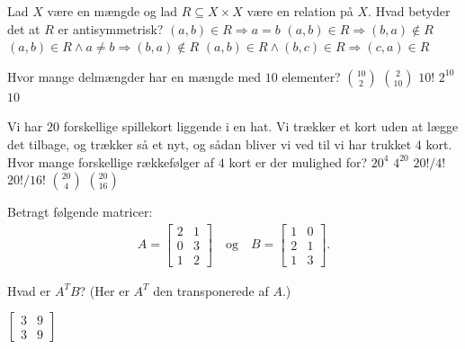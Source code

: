 Lad $X$ være en mængde og lad $R \subseteq X \times X$ være en relation på $X$.
Hvad betyder det at $R$ er antisymmetrisk?
\etsvar
\mulighederstart
\svar $(a,b)\in R \Rightarrow a=b$
\svar $(a,b)\in R \Rightarrow (b,a)\notin R$
\svar $(a,b) \in R \land a\neq b \Rightarrow (b,a) \notin R$ \korrekt
\svar $(a,b) \in R \land (b,c) \in R \Rightarrow (c,a) \in R$
\mulighederslut
{}
\sideskift

Hvor mange delmængder har en mængde med $10$ elementer?
\etsvar
\mulighederstart
\svar $\binom{10}{2}$
\svar $\binom{2}{10}$
\svar $10!$
\svar $2^{10}$ \korrekt
\svar $10$
\mulighederslut
{}


Vi har $20$ forskellige spillekort liggende i en hat.
Vi trækker et kort uden at lægge det tilbage, og trækker så et nyt, og sådan bliver vi ved til vi har trukket $4$ kort.
Hvor mange forskellige rækkefølger af $4$ kort er der mulighed for?
\etsvar
\mulighederstart
\svar $20^4$
\svar $4^{20}$
\svar $20!/4!$
\svar $20!/16!$  \korrekt
\svar $\binom{20}{4}$
\svar $\binom{20}{16}$
\mulighederslut
{}

Betragt følgende matricer:
\begin{align*}
    A =
\begin{bmatrix}
2 & 1\\
0 & 3\\
1 & 2
\end{bmatrix}
\quad \text{og} \quad
B =
\begin{bmatrix}
1 & 0\\
2 & 1\\
1 & 3
\end{bmatrix}.
\end{align*}

Hvad er \(A^{T}B\)? (Her er \(A^{T}\) den transponerede af \(A\).)
\etsvar
\mulighederstart

\svar \(\displaystyle \begin{bmatrix} 3 & 9\\ 3 & 9 \end{bmatrix}\)
\itxsvar{[[3,9],[3,9]]}

